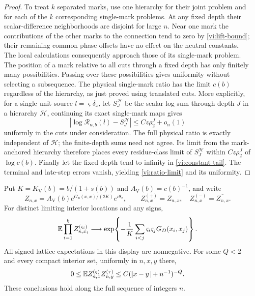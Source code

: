 \begin{proof}
To treat $k$ separated marks, use one hierarchy for their joint problem
and for each of the $k$ corresponding single-mark problems.  At any
fixed depth their scalar-difference neighborhoods are disjoint for large
$n$.  Near one mark the contributions of the other marks to the
connection tend to zero by \eqref{vi:lift-bound}; their remaining common
phase offsets have no effect on the neutral constants.  The local
calculations consequently approach those of its single-mark problem.
The position of a mark relative to all cuts through a fixed depth has
only finitely many possibilities.  Passing over these possibilities
gives uniformity without selecting a subsequence.  The physical
single-mark ratio has the limit $c(b)$ regardless of the hierarchy,
as just proved using translated cuts.  More explicitly, for a single
unit source $l=\varsigma\delta_x$, let $S_J^{\mathcal H}$ be
the scalar log sum through depth $J$ in
a hierarchy $\mathcal H$, continuing its exact single-mark maps gives
\[
 \left|\log\mathcal R_{n,b}(l)-S_J^{\mathcal H}\right|
       \le Cz\rho_2^J+o_n(1)
\]
uniformly in the cuts under consideration.  The full physical ratio
is exactly independent of $\mathcal H$; the finite-depth sums need
not agree.  Its limit from the mark-anchored hierarchy therefore
places every residue-class limit of $S_J^{\mathcal H}$ within
$Cz\rho_2^J$ of $\log c(b)$.  Finally let the fixed depth tend
to infinity in \eqref{vi:constant-tail}.  The terminal and late-step
errors vanish, yielding \eqref{vi:ratio-limit} and its uniformity.
\end{proof}

\begin{corollary}\label{vi:correlations}
Put $K=K_{\mathrm V}(b)=b/(1+s(b))$ and $A_{\mathrm V}(b)=c(b)^{-1}$,
and write
\[
 Z_{n,x}=A_{\mathrm V}(b)e^{G_n(x,x)/(2K)}e^{i\theta_x},\qquad
 Z_{n,x}^{(+)}=Z_{n,x},\quad Z_{n,x}^{(-)}=\overline{Z_{n,x}}.
\]
For distinct limiting interior locations and any signs,
\begin{equation}
 \mathbb E\prod_{i=1}^kZ_{n,x_i}^{(\varsigma_i)}
 \longrightarrow
 \exp\!\left\{-\frac1K\sum_{i<j}\varsigma_i\varsigma_j
                        G_D(x_i,x_j)\right\}.            \label{vi:multipoint}
\end{equation}
All signed lattice expectations in this display are nonnegative.  For
some $Q<2$ and every compact interior set, uniformly in $n,x,y$ there,
\begin{equation}
 0\le\mathbb E Z_{n,x}^{(\varsigma)}Z_{n,y}^{(\tau)}
           \le C(|x-y|+n^{-1})^{-Q}.                     \label{vi:two-point}
\end{equation}
These conclusions hold along the full sequence of integers $n$.
\end{corollary}

